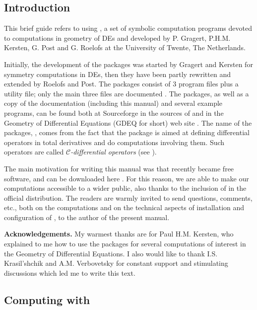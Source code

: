 
\subsection{Introduction}

This brief guide refers to using \cdiff, a set of symbolic computation programs
devoted to computations in geometry of DEs and developed by P. Gragert,
P.H.M. Kersten, G. Post and G. Roelofs at the University of Twente, The
Netherlands.

Initially, the development of the \cdiff packages was started by Gragert and
Kersten for symmetry computations in DEs, then they have been partly rewritten
and extended by Roelofs and Post. The \cdiff packages consist of 3 program
files plus a utility file; only the main three files are documented
\cite{svec,integ,tools}. The \cdiff packages, as well as a copy of the
documentation (including this manual) and several example programs, can be
found both at Sourceforge in the sources of \REDUCE \cite{red} and in the
Geometry of Differential Equations (GDEQ for short) web site \cite{gdeq}. The
name of the packages, \cdiff, comes from the fact that the package is aimed at
defining differential operators in total derivatives and do computations
involving them.  Such operators are called \emph{$\mathcal{C}$-differential
  operators} (see \cite{Many}).

The main motivation for writing this manual was that  recently became
free software, and can be downloaded here \cite{red}. For this reason, we are
able to make our computations accessible to a wider public, also thanks to the
inclusion of \cdiff in the official \REDUCE distribution. The readers are
warmly invited to send questions, comments, etc., both on the computations and
on the technical aspects of installation and configuration of \REDUCE, to the
author of the present manual.

\textbf{Acknowledgements.} My warmest thanks are for Paul H.M. Kersten, who
explained to me how to use the \cdiff packages for several computations of
interest in the Geometry of Differential Equations. I also would like to thank
I.S. Krasil'shchik and A.M. Verbovetsky for constant support and stimulating
discussions which led me to write this text.

\subsection{Computing with \cdiff}

